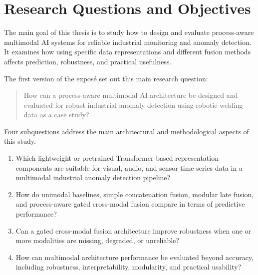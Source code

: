 
\section{Research Questions and Objectives}

The main goal of this thesis is to study how to design and evaluate
process-aware multimodal AI systems for reliable industrial
monitoring and anomaly detection. It examines how using specific
data representations and different fusion methods affects prediction,
robustness, and practical usefulness.

The first version of the expos\'{e} set out this main research
question:

\begin{quote}

How can a process-aware multimodal AI architecture be designed
and evaluated for robust industrial anomaly detection using
robotic welding data as a case study?

\end{quote}

Four subquestions address the main architectural and methodological
aspects of this study.

\begin{enumerate}[label=SQ\arabic*.,leftmargin=16mm]

\item Which lightweight or pretrained Transformer-based
representation components are suitable for visual, audio, and
sensor time-series data in a multimodal industrial anomaly
detection pipeline?

\item How do unimodal baselines, simple concatenation fusion,
modular late fusion, and process-aware gated cross-modal fusion
compare in terms of predictive performance?

\item Can a gated cross-modal fusion architecture improve
robustness when one or more modalities are missing, degraded,
or unreliable?

\item How can multimodal architecture performance be evaluated
beyond accuracy, including robustness, interpretability,
modularity, and practical usability?

\end{enumerate}

